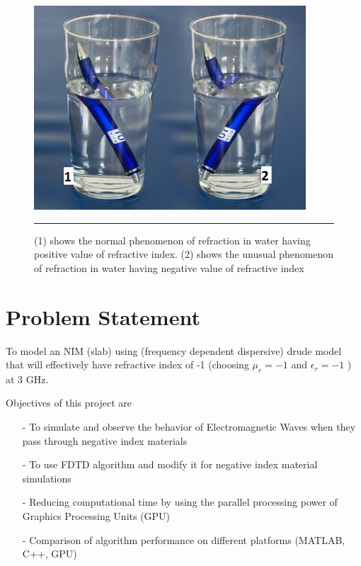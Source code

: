 \begin{figure}[htbp]
	\centering
		\includegraphics[width=4in]{Pictures/glass.jpg}
		\rule{35em}{0.5pt}
	\caption[Illustration of NIM]{(1) shows the normal phenomenon of refraction in water having positive value of refractive index. (2) shows the unusual phenomenon of refraction in water having negative value of refractive index}
	\label{fig:glass}
\end{figure}


\section{Problem Statement}

To model an NIM (slab) using (frequency dependent dispersive) drude model that will effectively have refractive index of -1 (choosing $\mu_{r} = -1$ and $\epsilon_{r} = -1$ ) at 3 GHz.

Objectives of this project are 
\begin{itemize}
\item[-] To simulate and observe the behavior of Electromagnetic Waves when they pass through negative index materials
\item[-] To use FDTD algorithm and modify it for negative index material simulations
\item[-] Reducing computational time by using the parallel processing power of Graphics Processing Units (GPU)
\item[-] Comparison of algorithm performance on different platforms (MATLAB, C++, GPU)
\end{itemize}


